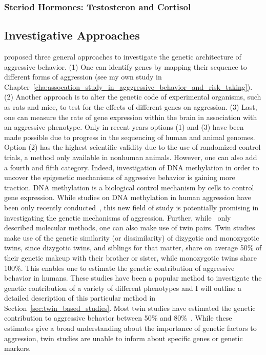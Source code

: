 \subsubsection{Steriod Hormones: Testosteron and Cortisol}
\label{ssub:steriod_hormones_testosteron_and_cortisol}

\subsection{Investigative Approaches}
\label{sub:investigation_approaches}

\citet{Maxson2005} proposed three general approaches to investigate the genetic architecture of aggressive behavior.
(1) One can identify genes by mapping their sequence to different forms of aggression (see my own study in Chapter~\ref{cha:assocation_study_in_agggressive_behavior_and_risk_taking}).
(2) Another approach is to alter the genetic code of experimental organisms, such as rats and mice, to test for the effects of different genes on aggression.
(3) Last, one can measure the rate of gene expression within the brain in association with an aggressive phenotype.
Only in recent years options (1) and (3) have been made possible due to progress in the sequencing of human and animal genomes.
Option (2) has the highest scientific validity due to the use of randomized control trials, a method only available in nonhuman animals.
However, one can also add a fourth and fifth category.
Indeed, investigation of DNA methylation in order to uncover the epigenetic mechanisms of aggressive behavior is gaining more traction.
DNA methylation is a biological control mechanism by cells to control gene expression.
While studies on DNA methylation in human aggression have been only recently  conducted~\cite{VanDongen2015a}, this new field of study is potentially promising in investigating the genetic mechanisms of aggression.
Further, while~\citet{Maxson2005} only described molecular methods, one can also make use of twin pairs.
Twin studies make use of the genetic similarity (or dissimilarity) of dizygotic and monozygotic twins, since dizygotic twins, and siblings for that matter, share on average 50\% of their genetic makeup with their brother or sister, while monozygotic twins share 100\%.
This enables one to estimate the genetic contribution of aggressive behavior in humans.
These studies have been a popular method to investigate the genetic contribution of a variety of different phenotypes and I will outline a detailed description of this particular method in Section~\ref{sec:twin_based_studies}. 
Most twin studies have estimated the genetic contribution to aggressive behavior between 50\% and 80\%~\cite{Porsch2016}.
While these estimates give a broad understanding about the importance of genetic factors  to aggression, twin studies are unable to inform about specific genes or genetic markers.

